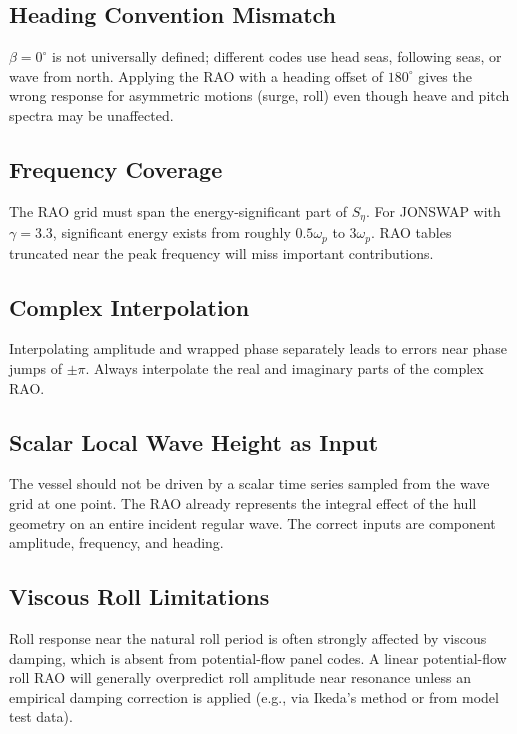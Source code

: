 \documentclass[journal,10pt,twocolumn]{IEEEtran}
\begin{document}
    \subsection{Heading Convention Mismatch}
    \label{sec:head_mismatch}

    $\beta=0^\circ$ is not universally defined; different codes use head seas, following
    seas, or wave from north.
    Applying the RAO with a heading offset of $180^\circ$ gives the wrong response for
    asymmetric motions (surge, roll) even though heave and pitch spectra may be unaffected.

    \subsection{Frequency Coverage}
    \label{sec:freqcov}

    The RAO grid must span the energy-significant part of $S_\eta$.
    For JONSWAP with $\gamma=3.3$, significant energy exists from roughly
    $0.5\omega_p$ to $3\omega_p$.
    RAO tables truncated near the peak frequency will miss important contributions.

    \subsection{Complex Interpolation}
    \label{sec:interp}

    Interpolating amplitude and wrapped phase separately leads to errors near
    phase jumps of $\pm\pi$.
    Always interpolate the real and imaginary parts of the complex RAO.

    \subsection{Scalar Local Wave Height as Input}
    \label{sec:localeta}

    The vessel should not be driven by a scalar time series sampled from the wave grid at
    one point.
    The RAO already represents the integral effect of the hull geometry on an entire
    incident regular wave.
    The correct inputs are component amplitude, frequency, and heading.

    \subsection{Viscous Roll Limitations}
    \label{sec:roll}

    Roll response near the natural roll period is often strongly affected by viscous
    damping, which is absent from potential-flow panel codes.
    A linear potential-flow roll RAO will generally overpredict roll amplitude near
    resonance unless an empirical damping correction is applied
    (e.g., via Ikeda's method or from model test data).
\end{document}
